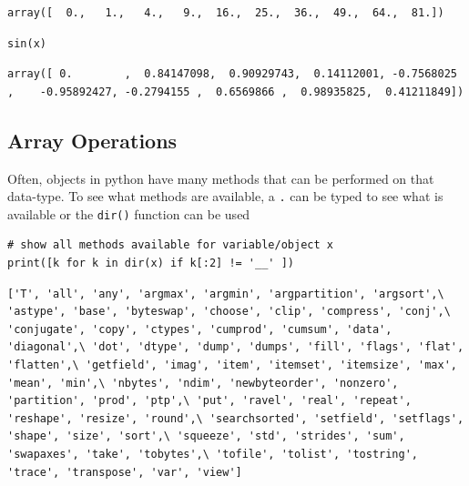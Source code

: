 \documentclass[%
oneside,                 %
final,                   %
10pt]{article}
\begin{document}
\begin{Verbatim}[numbers=none,fontsize=\fontsize{9pt}{9pt},baselinestretch=0.95,xleftmargin=2mm]
array([  0.,   1.,   4.,   9.,  16.,  25.,  36.,  49.,  64.,  81.])
\end{Verbatim}


\begin{Verbatim}[numbers=none,fontsize=\fontsize{9pt}{9pt},baselinestretch=0.95,xleftmargin=2mm]
sin(x)
\end{Verbatim}

\begin{Verbatim}[numbers=none,fontsize=\fontsize{9pt}{9pt},baselinestretch=0.95,xleftmargin=2mm]
array([ 0.        ,  0.84147098,  0.90929743,  0.14112001, -0.7568025 ,    -0.95892427, -0.2794155 ,  0.6569866 ,  0.98935825,  0.41211849])
\end{Verbatim}


\subsection{Array Operations}

Often, objects in python have many methods that can be performed on that data-type. To see what methods are available, a \texttt{.} can be typed to see what is available or the \texttt{dir()} function can be used

\begin{Verbatim}[numbers=none,fontsize=\fontsize{9pt}{9pt},baselinestretch=0.95,xleftmargin=2mm]
# show all methods available for variable/object x
print([k for k in dir(x) if k[:2] != '__' ])
\end{Verbatim}

\begin{Verbatim}[numbers=none,fontsize=\fontsize{9pt}{9pt},baselinestretch=0.95,xleftmargin=2mm]
['T', 'all', 'any', 'argmax', 'argmin', 'argpartition', 'argsort',\ 'astype', 'base', 'byteswap', 'choose', 'clip', 'compress', 'conj',\ 'conjugate', 'copy', 'ctypes', 'cumprod', 'cumsum', 'data', 'diagonal',\ 'dot', 'dtype', 'dump', 'dumps', 'fill', 'flags', 'flat', 'flatten',\ 'getfield', 'imag', 'item', 'itemset', 'itemsize', 'max', 'mean', 'min',\ 'nbytes', 'ndim', 'newbyteorder', 'nonzero', 'partition', 'prod', 'ptp',\ 'put', 'ravel', 'real', 'repeat', 'reshape', 'resize', 'round',\ 'searchsorted', 'setfield', 'setflags', 'shape', 'size', 'sort',\ 'squeeze', 'std', 'strides', 'sum', 'swapaxes', 'take', 'tobytes',\ 'tofile', 'tolist', 'tostring', 'trace', 'transpose', 'var', 'view']
\end{Verbatim}
\end{document}
